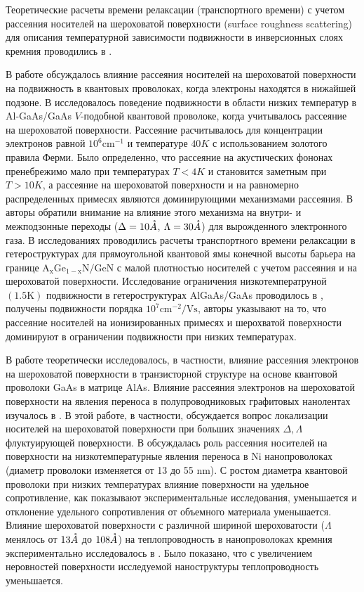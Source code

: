Теоретические расчеты времени релаксации (транспортного времени) с учетом рассеяния носителей на шероховатой поверхности (surface roughness scattering) для описания температурной зависимости подвижности в инверсионных слоях кремния проводились в \cite{Stern1980,Masaki1989}.

В работе \cite{Motohisa1992} обсуждалось влияние рассеяния носителей на шероховатой поверхности на подвижность в квантовых проволоках, когда электроны находятся в нижайшей подзоне. В \cite{Tsetseri2004,Tsetseri2008} исследовалось поведение подвижности в области низких температур в Al-GaAs/GaAs $V$-подобной квантовой проволоке, когда учитывалось рассеяние на шероховатой поверхности. Рассеяние расчитывалось для концентрации электронов равной $10^6 \mathrm{cm^{-1}}$ и температуре $40 K$ с использованием золотого правила Ферми. Было определенно, что рассеяние на акустических фононах пренебрежимо мало при температурах $T<4K$ и становится заметным при $T>10K$, а рассеяние на шероховатой поверхности и на равномерно распределенных примесях являются доминирующими механизмами рассеяния.
В \cite{Vurgaftman1997} авторы обратили внимание на влияние этого механизма на внутри- и межподзонные переходы ($\Delta =10\AA$, $\Lambda =30 \AA$) для вырожденного электронного газа. В исследованиях \cite{Quang2006} проводились расчеты транспортного времени релаксации в гетероструктурах для прямоугольной квантовой ямы конечной высоты барьера на границе $\mathrm{ A_x Ge_{1-x}N/GeN}$ с малой плотностью носителей с учетом рассеяния и на шероховатой поверхности.
Исследование ограничения низкотемператруной $(1.5 \mathrm{K})$ подвижности в гетероструктурах AlGaAs/GaAs проводилось в \cite{Saku1996,Saku1991}, получены подвижности порядка $10^7 \text{cm}^{-2} / \text{Vs}$, авторы указывают на то, что рассеяние носителей на ионизированных примесях и шерохватой поверхности доминируют в ограничении подвижности при низких температурах.

В работе \cite{Borzdov2007} теоретически исследовалось, в частности, влияние рассеяния электронов на шероховатой поверхности в транзисторной структуре на основе квантовой проволоки GaAs в матрице AlAs. Влияние рассеяния электронов на шероховатой поверхности на явления переноса в полупроводниковых графитовых нанолентах изучалось в \cite{Fang2008}. В этой работе, в частности, обсуждается вопрос локализации носителей на шероховатой поверхности при больших значениях $\Delta, \Lambda$ флуктуирующей поверхности. В \cite{Kamalakar2009} обсуждалась роль рассеяния носителей на поверхности на низкотемпературные явления переноса в Ni нанопроволоках (диаметр проволоки изменяется от 13 до 55 nm). С ростом диаметра квантовой проволоки при низких температурах влияние поверхности на удельное сопротивление, как показывают экспериментальные исследования, уменьшается и отклонение удельного сопротивления от объемного материала уменьшается. Влияние шероховатой поверхности с различной шириной шероховатости ($\Lambda $ менялось от $13 \AA$  до $108 \AA$) на теплопроводность в нанопроволоках кремния экспериментально исследовалось в \cite{Liu2010}. Было показано, что с увеличением неровностей поверхности исследуемой наноструктуры теплопроводность уменьшается.

